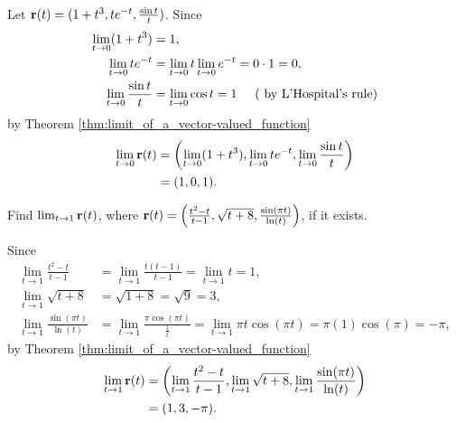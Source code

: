 \documentclass[12pt,letterpaper,reqno]{article}
\numberwithin{equation}{section}
\newcommand{\bbr}{{\bf r}}
\begin{document}
{\begin{example}
Let $\bbr(t)=(1+t^3,te^{-t},\frac{\sin t}{t})$. Since
\begin{align*}
	\lim_{t \to 0}(1+t^3)&=1, \\
	\lim_{t \to 0}te^{-t}&=\lim_{t \to 0}t \lim_{t \to 0}e^{-t}=0 \cdot 1=0, \\
	\lim_{t \to 0}\frac{\sin t}{t}&=\lim_{t \to 0}\cos t=1 \hspace{0.5cm}\text{( by L'Hospital's rule)}
\end{align*}	
by Theorem \ref{thm:limit_of_a_vector-valued_function}
\begin{align*}
	\lim_{t \to 0}\bbr(t)&=\left(\lim_{t \to 0}(1+t^3),\lim_{t \to 0}te^{-t},\lim_{t \to 0}\frac{\sin t}{t}\right) \\
	&=(1,0,1).
\end{align*}
\end{example}

\begin{exercise}
Find $\lim_{t \to 1}\bbr(t)$, where $\bbr(t)=\left(\frac{t^2-t}{t-1},\sqrt{t+8},\frac{\sin(\pi t)}{\ln(t)}\right)$, if it exists.	
\end{exercise}

{\color{red} \begin{solution}
 	Since
 	\begin{align*}
 		\lim_{t \to 1}\frac{t^2-t}{t-1}&=\lim_{t \to 1}\frac{t(t-1)}{t-1}=\lim_{t \to 1}t=1, \\
 		\lim_{t \to 1}\sqrt{t+8}&=\sqrt{1+8}=\sqrt{9}=3, \\
 		\lim_{t \to 1}\frac{\sin(\pi t)}{\ln(t)}&=\lim_{t \to 1}\frac{\pi \cos(\pi t)}{\frac{1}{t}}=\lim_{t \to 1}\pi t\cos(\pi t)=\pi(1)\cos(\pi)=-\pi,
 	\end{align*}
 	by Theorem \ref{thm:limit_of_a_vector-valued_function}
 	\begin{align*}
 		\lim_{t \to 1}\bbr(t)&=\left(\lim_{t \to 1}\frac{t^2-t}{t-1},\lim_{t \to 1}\sqrt{t+8},\lim_{t \to 1}\frac{\sin(\pi t)}{\ln(t)}\right) \\
 		&=(1,3,-\pi).
 	\end{align*}
 \end{solution}}

}
\end{document}
